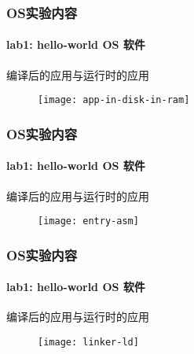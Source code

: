 \begin{frame}
    \frametitle{OS实验内容}
    \framesubtitle{lab1: hello-world OS  软件}
    
    编译后的应用与运行时的应用
    \begin{figure}
        \centering
        \texttt{[image: app-in-disk-in-ram]} %
    \end{figure}
\end{frame}

\begin{frame}
    \frametitle{OS实验内容}
    \framesubtitle{lab1: hello-world OS  软件}
    
    编译后的应用与运行时的应用
    \begin{figure}
        \centering
        \texttt{[image: entry-asm]} %
    \end{figure}
\end{frame}

\begin{frame}
    \frametitle{OS实验内容}
    \framesubtitle{lab1: hello-world OS  软件}
    
    编译后的应用与运行时的应用
    \begin{figure}
        \centering
        \texttt{[image: linker-ld]} %
    \end{figure}
\end{frame}

